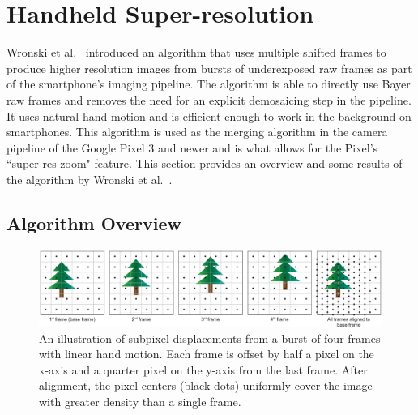 \documentclass{sig-alternate}
\begin{document}
\section{Handheld Super-resolution}
\label{sec:handheldSuperRes}




Wronski et al.~\cite{Wronski2019} introduced an algorithm that uses multiple shifted frames to produce higher resolution images from bursts of underexposed raw frames as part of the smartphone's imaging pipeline. The algorithm is able to directly use Bayer raw frames and removes the need for an explicit demosaicing step in the pipeline. It uses natural hand motion and is efficient enough to work in the background on smartphones. This algorithm is used as the merging algorithm in the camera pipeline of the Google Pixel 3 and newer and is what allows for the Pixel's ``super-res zoom" feature. This section provides an overview and some results of the algorithm by Wronski et al.~\cite{Wronski2019}.

\subsection{Algorithm Overview}

\begin{figure}
\centering
\includegraphics[width=\textwidth]{Wronski2019-figure-4}
\caption{An illustration of subpixel displacements from a burst of four frames with linear hand motion. Each frame is offset by half a pixel on the x-axis and a quarter pixel on the y-axis from the last frame. After alignment, the pixel centers (black dots) uniformly cover the image with greater density than a single frame.~\cite{Wronski2019}}
\label{fig:Wronski2019Fig4}



\end{figure}
\end{document}

